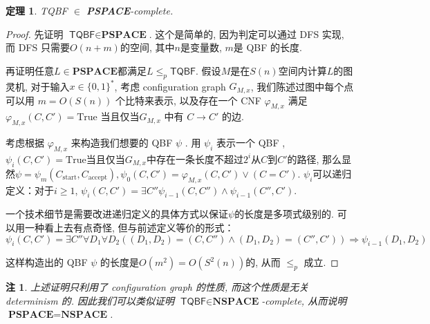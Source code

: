 \documentclass[8pt]{article}
\theoremstyle{compact}
\newtheorem{theorem}{定理}[section]
\newtheorem{remark}{注}[section]
\def\le{\leqslant}
\def\ge{\geqslant}
\def\NSPACE{\textbf{NSPACE}}
\def\PSPACE{\textbf{PSPACE}}
\begin{document}
\begin{theorem}
	\textsf{TQBF} $\in$ \PSPACE-complete.
\end{theorem}
\begin{proof}
	先证明 $\textsf{TQBF} \in \PSPACE$. 这个是简单的, 因为判定可以通过 DFS 实现, 而 DFS 只需要$O(n + m)$的空间, 其中$n$是变量数, $m$是 QBF 的长度. 

	再证明任意$L \in \PSPACE$都满足$L \le_p \textsf{TQBF}$. 假设$M$是在$S(n)$空间内计算$L$的图灵机, 对于输入$x \in \{0, 1\}^*$, 考虑 configuration graph $G_{M, x}$, 我们陈述过图中每个点可以用 $m = O(S(n))$ 个比特来表示, 以及存在一个 CNF $\varphi_{M, x}$ 满足$\varphi_{M, x}(C, C') = \textrm{True}$ 当且仅当$G_{M, x}$ 中有 $C \to C'$ 的边. 

	考虑根据 $\varphi_{M, x}$ 来构造我们想要的 QBF $\psi$ . 用 $\psi_i$ 表示一个 QBF , $\psi_i(C, C') = \textrm{True}$当且仅当$G_{M, x}$中存在一条长度不超过$2^i$从$C$到$C'$的路径, 那么显然$\psi = \psi_m(C_{\text{start}}, C_{\text{accept}}), \psi_0(C, C') = \varphi_{M, x}(C, C') \vee (C = C')$. $\psi_i$可以递归定义：对于$i \ge 1$, $\psi_i(C, C') = \exists C'' \psi_{i-1}(C, C'') \wedge \psi_{i-1}(C'', C')$. 

	一个技术细节是需要改进递归定义的具体方式以保证$\psi$的长度是多项式级别的. 可以用一种看上去有点奇怪, 但与前述定义等价的形式：
	$$\psi_i(C, C') = \exists C''\forall D_1 \forall D_2 ((D_1, D_2) = (C, C'') \wedge (D_1, D_2) = (C'', C')) \Rightarrow \psi_{i-1}(D_1, D_2)$$

	这样构造出的 QBF $\psi$ 的长度是$O(m^2) = O(S^2(n))$的, 从而 $\le_p$ 成立.
\end{proof}
\begin{remark}
	上述证明只利用了 configuration graph 的性质, 而这个性质是无关 determinism 的. 因此我们可以类似证明 $\textsf{TQBF} \in \NSPACE$-complete, 从而说明 $\PSPACE = \NSPACE$.
\end{remark}

\end{document}
